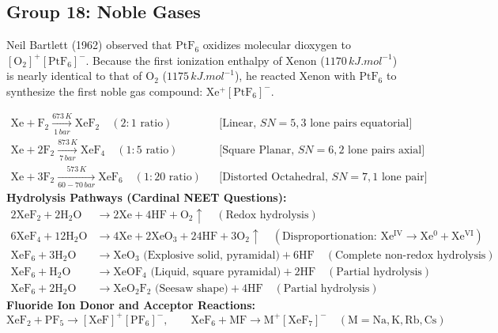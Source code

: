 \documentclass[10pt,a4paper]{article}
\begin{document}
\subsection{Group 18: Noble Gases}
Neil Bartlett (1962) observed that $\mathrm{PtF_6}$ oxidizes molecular dioxygen to $[\mathrm{O_2}]^+[\mathrm{PtF_6}]^-$. Because the first ionization enthalpy of Xenon ($1170\,\si{kJ.mol^{-1}}$) is nearly identical to that of $\mathrm{O_2}$ ($1175\,\si{kJ.mol^{-1}}$), he reacted Xenon with $\mathrm{PtF_6}$ to synthesize the first noble gas compound: $\mathrm{Xe^+[PtF_6]^-}$.

\begin{formulabox}
\begin{align}
  \mathrm{Xe} + \mathrm{F_2} \xrightarrow[1\,\si{bar}]{673\,\si{K}} \mathrm{XeF_2} \quad (2:1\text{ ratio}) && \text{[Linear, } SN=5, 3\text{ lone pairs equatorial]} \\
  \mathrm{Xe} + 2\mathrm{F_2} \xrightarrow[7\,\si{bar}]{873\,\si{K}} \mathrm{XeF_4} \quad (1:5\text{ ratio}) && \text{[Square Planar, } SN=6, 2\text{ lone pairs axial]} \\
  \mathrm{Xe} + 3\mathrm{F_2} \xrightarrow[60-70\,\si{bar}]{573\,\si{K}} \mathrm{XeF_6} \quad (1:20\text{ ratio}) && \text{[Distorted Octahedral, } SN=7, 1\text{ lone pair]}
\end{align}
\textbf{Hydrolysis Pathways (Cardinal NEET Questions):}
\begin{align}
  2\mathrm{XeF_2} + 2\mathrm{H_2O} &\longrightarrow 2\mathrm{Xe} + 4\mathrm{HF} + \mathbf{\mathrm{O_2\uparrow}} \quad (\text{Redox hydrolysis}) \\
  6\mathrm{XeF_4} + 12\mathrm{H_2O} &\longrightarrow 4\mathrm{Xe} + 2\mathbf{\mathrm{XeO_3}} + 24\mathrm{HF} + 3\mathbf{\mathrm{O_2\uparrow}} \quad (\text{Disproportionation: } \mathrm{Xe^{IV}} \to \mathrm{Xe^0 + Xe^{VI}}) \\
  \mathrm{XeF_6} + 3\mathrm{H_2O} &\longrightarrow \mathbf{\mathrm{XeO_3}}\text{ (Explosive solid, pyramidal)} + 6\mathrm{HF} \quad (\text{Complete non-redox hydrolysis}) \\
  \mathrm{XeF_6} + \mathrm{H_2O} &\longrightarrow \mathbf{\mathrm{XeOF_4}}\text{ (Liquid, square pyramidal)} + 2\mathrm{HF} \quad (\text{Partial hydrolysis}) \\
  \mathrm{XeF_6} + 2\mathrm{H_2O} &\longrightarrow \mathbf{\mathrm{XeO_2F_2}}\text{ (Seesaw shape)} + 4\mathrm{HF} \quad (\text{Partial hydrolysis})
\end{align}
\textbf{Fluoride Ion Donor and Acceptor Reactions:}
\begin{equation}
  \mathrm{XeF_2} + \mathrm{PF_5} \longrightarrow [\mathrm{XeF}]^+[\mathrm{PF_6}]^-, \qquad \mathrm{XeF_6} + \mathrm{MF} \longrightarrow \mathrm{M}^+[\mathrm{XeF_7}]^- \quad (\mathrm{M} = \mathrm{Na, K, Rb, Cs})
\end{equation}
\end{formulabox}
\end{document}
